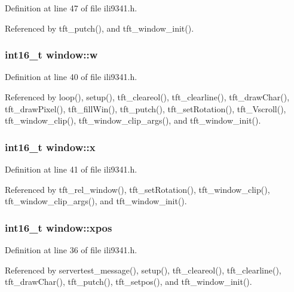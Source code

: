 Definition at line 47 of file ili9341.\-h.



Referenced by tft\-\_\-putch(), and tft\-\_\-window\-\_\-init().

\hypertarget{structwindow_ad89fdeb11ce94e2e7501f7290372d6ae}{
\subsubsection[{w}]{\setlength{\rightskip}{0pt plus 5cm}int16\-\_\-t window\-::w}}\label{structwindow_ad89fdeb11ce94e2e7501f7290372d6ae}


Definition at line 40 of file ili9341.\-h.



Referenced by loop(), setup(), tft\-\_\-cleareol(), tft\-\_\-clearline(), tft\-\_\-draw\-Char(), tft\-\_\-draw\-Pixel(), tft\-\_\-fill\-Win(), tft\-\_\-putch(), tft\-\_\-set\-Rotation(), tft\-\_\-\-Vscroll(), tft\-\_\-window\-\_\-clip(), tft\-\_\-window\-\_\-clip\-\_\-args(), and tft\-\_\-window\-\_\-init().

\hypertarget{structwindow_a879b99940dfc34772f0257f54c67b817}{
\subsubsection[{x}]{\setlength{\rightskip}{0pt plus 5cm}int16\-\_\-t window\-::x}}\label{structwindow_a879b99940dfc34772f0257f54c67b817}


Definition at line 41 of file ili9341.\-h.



Referenced by tft\-\_\-rel\-\_\-window(), tft\-\_\-set\-Rotation(), tft\-\_\-window\-\_\-clip(), tft\-\_\-window\-\_\-clip\-\_\-args(), and tft\-\_\-window\-\_\-init().

\hypertarget{structwindow_a890a7dba31e7328500f4e5e41e51aab7}{
\subsubsection[{xpos}]{\setlength{\rightskip}{0pt plus 5cm}int16\-\_\-t window\-::xpos}}\label{structwindow_a890a7dba31e7328500f4e5e41e51aab7}


Definition at line 36 of file ili9341.\-h.



Referenced by servertest\-\_\-message(), setup(), tft\-\_\-cleareol(), tft\-\_\-clearline(), tft\-\_\-draw\-Char(), tft\-\_\-putch(), tft\-\_\-setpos(), and tft\-\_\-window\-\_\-init().

